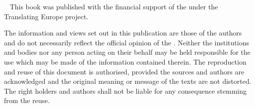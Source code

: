 ~
\vfill
\noindent
This book was published with the financial support of the  under the Translating Europe project. 

\label{disclaimer}
The information and views set out in this publication are those of the authors and do not necessarily reflect the official opinion of the . Neither the  institutions and bodies nor any person acting on their behalf may be held responsible for the use which may be made of the information contained therein. The reproduction and reuse of this document is
authorised, provided the sources and authors are acknowledged and the original meaning or message of the texts are not distorted. The right holders and authors shall not be liable for any consequence stemming from the reuse. 
